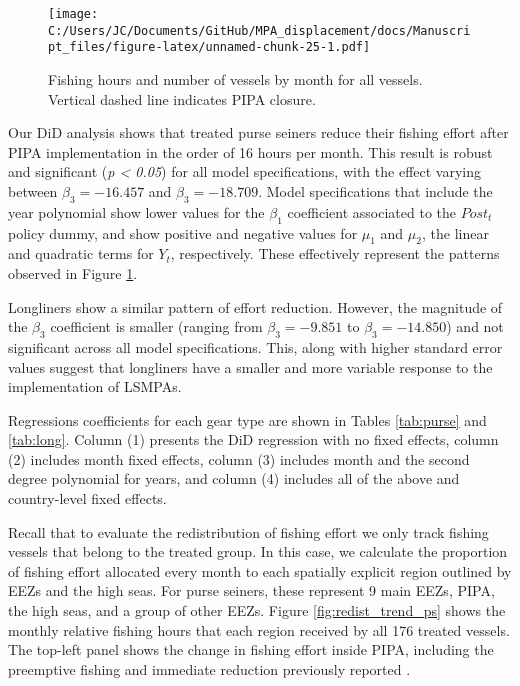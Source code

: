 \documentclass[12pt,]{article}
\begin{document}
\begin{figure}
\centering
\texttt{[image: C:/Users/JC/Documents/GitHub/MPA\_displacement/docs/Manuscript\_files/figure-latex/unnamed-chunk-25-1.pdf]}
\caption{\label{fig:unnamed-chunk-25}\label{fig:all_vessels}Fishing hours
and number of vessels by month for all vessels. Vertical dashed line
indicates PIPA closure.}
\end{figure}

Our DiD analysis shows that treated purse seiners reduce their fishing
effort after PIPA implementation in the order of 16 hours per month.
This result is robust and significant (\emph{p \textless{} 0.05}) for
all model specifications, with the effect varying between
\(\beta_3 = -16.457\) and \(\beta_3 = -18.709\). Model specifications
that include the year polynomial show lower values for the \(\beta_1\)
coefficient associated to the \(Post_t\) policy dummy, and show positive
and negative values for \(\mu_1\) and \(\mu_2\), the linear and
quadratic terms for \(Y_t\), respectively. These effectively represent
the patterns observed in Figure \ref{fig:all_vessels}.

Longliners show a similar pattern of effort reduction. However, the
magnitude of the \(\beta_3\) coefficient is smaller (ranging from
\(\beta_3 = -9.851\) to \(\beta_3 = -14.850\)) and not significant
across all model specifications. This, along with higher standard error
values suggest that longliners have a smaller and more variable response
to the implementation of LSMPAs.

Regressions coefficients for each gear type are shown in Tables
\ref{tab:purse} and \ref{tab:long}. Column (1) presents the DiD
regression with no fixed effects, column (2) includes month fixed
effects, column (3) includes month and the second degree polynomial for
years, and column (4) includes all of the above and country-level fixed
effects.

Recall that to evaluate the redistribution of fishing effort we only
track fishing vessels that belong to the treated group. In this case, we
calculate the proportion of fishing effort allocated every month to each
spatially explicit region outlined by EEZs and the high seas. For purse
seiners, these represent 9 main EEZs, PIPA, the high seas, and a group
of other EEZs. Figure \ref{fig:redist_trend_ps} shows the monthly
relative fishing hours that each region received by all 176 treated
vessels. The top-left panel shows the change in fishing effort inside
PIPA, including the preemptive fishing and immediate reduction
previously reported \citep{mcdermott_2018}.
\end{document}

